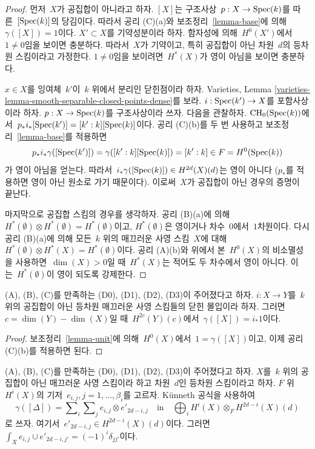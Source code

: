 \begin{proof}
먼저\  $X$가 공집합이 아니라고 하자.
$[X]$는 구조사상\  $p : X \to \mathop{\mathrm{Spec}}(k)$를 따른\  $[\mathop{\mathrm{Spec}}(k)]$의 당김이다.
따라서 공리 (C)(a)와 보조정리\  \ref{lemma-base}에 의해\ 
$\gamma([X]) = 1$이다. $X' \subset X$를 기약성분이라 하자.
함자성에 의해\  $H^0(X')$에서\  $1 \not = 0$임을 보이면 충분하다.
따라서\  $X$가 기약이고, 특히 공집합이 아닌 차원\  $d$의 등차원
스킴이라고 가정한다. $1 \not = 0$임을 보이려면\  $H^*(X)$가 영이
아님을 보이면 충분하다.

\medskip\noindent
$x \in X$를 잉여체\  $k'$이\  $k$ 위에서 분리인 닫힌점이라 하자.
Varieties, Lemma
\ref{varieties-lemma-smooth-separable-closed-points-dense}를 보라.
$i : \mathop{\mathrm{Spec}}(k') \to X$를 포함사상이라 하자.
$p : X \to \mathop{\mathrm{Spec}}(k)$를 구조사상이라 쓰자. 다음을 관찰하자.
$\mathop{\mathrm{CH}}\nolimits_0(\mathop{\mathrm{Spec}}(k))$에서\ 
$p_*i_*[\mathop{\mathrm{Spec}}(k')] = [k' : k][\mathop{\mathrm{Spec}}(k)]$이다.
공리 (C)(b)를 두 번 사용하고 보조정리\  \ref{lemma-base}를 적용하면
$$
p_*i_*\gamma([\mathop{\mathrm{Spec}}(k')]) = \gamma([k' : k][\mathop{\mathrm{Spec}}(k)]) = [k' : k]
\in F = H^0(\mathop{\mathrm{Spec}}(k))
$$
가 영이 아님을 얻는다. 따라서\ 
$i_*\gamma([\mathop{\mathrm{Spec}}(k)]) \in H^{2d}(X)(d)$는 영이 아니다
($p_*$를 적용하면 영이 아닌 원소로 가기 때문이다). 이로써\  $X$가
공집합이 아닌 경우의 증명이 끝난다.

\medskip\noindent
마지막으로 공집합 스킴의 경우를 생각하자. 공리 (B)(a)에 의해\ 
$H^*(\emptyset) \otimes H^*(\emptyset) = H^*(\emptyset)$이고,
$H^*(\emptyset)$은 영이거나 차수\  $0$에서\  $1$차원이다.
다시 공리 (B)(a)에 의해 모든\  $k$ 위의 매끄러운 사영 스킴\  $X$에 대해\ 
$H^*(\emptyset) \otimes H^*(X) = H^*(\emptyset)$이다.
공리 (A)(b)와 위에서 본\  $H^0(X)$의 비소멸성을 사용하면\ 
$\dim(X) > 0$일 때\  $H^*(X)$는 적어도 두 차수에서 영이 아니다.
이는\  $H^*(\emptyset)$이 영이 되도록 강제한다.
\end{proof}

\begin{lemma}
\label{lemma-push-unit}
(A), (B), (C)를 만족하는 (D0), (D1), (D2), (D3)이 주어졌다고 하자.
$i : X \to Y$를\  $k$ 위의 공집합이 아닌 등차원 매끄러운 사영
스킴들의 닫힌 몰입이라 하자. 그러면\ 
$c = \dim(Y) - \dim(X)$일 때\  $H^{2c}(Y)(c)$에서\ 
$\gamma([X]) = i_*1$이다.
\end{lemma}

\begin{proof}
보조정리\  \ref{lemma-unit}에 의해\  $H^0(X)$에서\ 
$1 = \gamma([X])$이고, 이제 공리 (C)(b)를 적용하면 된다.
\end{proof}

\begin{lemma}
\label{lemma-class-diagonal}
(A), (B), (C)를 만족하는 (D0), (D1), (D2), (D3)이 주어졌다고 하자.
$X$를\  $k$ 위의 공집합이 아닌 매끄러운 사영 스킴이라 하고 차원\ 
$d$인 등차원 스킴이라고 하자. $F$ 위\  $H^i(X)$의 기저\ 
$e_{i, j}, j = 1, \ldots, \beta_i$를 고르자. K\"unneth 공식을 사용하여
$$
\gamma([\Delta]) =
\sum\nolimits_i
\sum\nolimits_j e_{i, j} \otimes e'_{2d - i , j}
\quad\text{in}\quad
\bigoplus\nolimits_i H^i(X) \otimes_F H^{2d - i}(X)(d)
$$
로 쓰자. 여기서\  $e'_{2d - i, j} \in H^{2d - i}(X)(d)$이다.
그러면\  $\int_X e_{i, j} \cup e'_{2d - i, j'} = (-1)^i\delta_{jj'}$이다.
\end{lemma}

